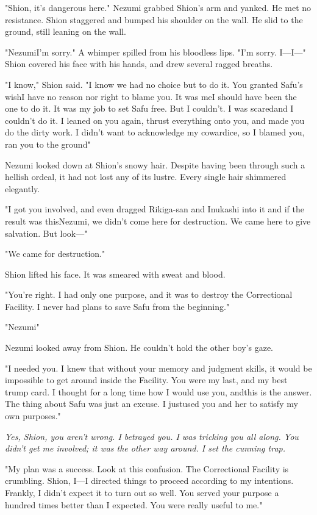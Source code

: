 "Shion, it's dangerous here." Nezumi grabbed Shion's arm and yanked. He
met no resistance. Shion staggered and bumped his shoulder on the wall.
He slid to the ground, still leaning on the wall.

"Nezumi\el I'm sorry." A whimper spilled from his bloodless lips. "I'm
sorry. I---I---" Shion covered his face with his hands, and drew several
ragged breaths.

"I know," Shion said. "I know we had no choice but to do it. You granted
Safu's wish\el I have no reason nor right to blame you. It was me\el I
should have been the one to do it. It was my job to set Safu free. But I
couldn't. I was scared\el and I couldn't do it. I leaned on you again,
thrust everything onto you, and made you do the dirty work. I didn't
want to acknowledge my cowardice, so I blamed you, ran you to the
ground\el "

Nezumi looked down at Shion's snowy hair. Despite having been through
such a hellish ordeal, it had not lost any of its lustre. Every single
hair shimmered elegantly.

"I got you involved, and even dragged Rikiga-san and Inukashi into it\el 
and if the result was this\el Nezumi, we didn't come here for
destruction. We came here to give salvation. But look---"

"We came for destruction."

Shion lifted his face. It was smeared with sweat and blood.

"You're right. I had only one purpose, and it was to destroy the
Correctional Facility. I never had plans to save Safu from the
beginning."

"Nezumi\el "

Nezumi looked away from Shion. He couldn't hold the other boy's gaze.

"I needed you. I knew that without your memory and judgment skills, it
would be impossible to get around inside the Facility. You were my last,
and my best trump card. I thought for a long time how I would use you,
and\el this is the answer. The thing about Safu was just an excuse. I
just\el used you and her to satisfy my own purposes."

\emph{Yes, Shion, you aren't wrong. I betrayed you. I was tricking you all
along. You didn't get me involved; it was the other way around. I set
the cunning trap.}

"My plan was a success. Look at this confusion. The Correctional
Facility is crumbling. Shion, I---I directed things to proceed according
to my intentions. Frankly, I didn't expect it to turn out so well. You
served your purpose a hundred times better than I expected. You were\el 
really useful to me."


